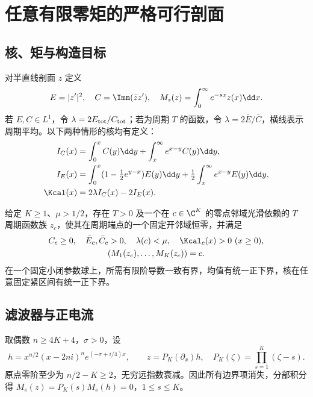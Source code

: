\section{任意有限零矩的严格可行剖面}\label{sec:profile}
\subsection{核、矩与构造目标}
对半直线剖面 $z$ 定义
\begin{equation}\label{eq:profile-densities}
E=|z'|^2,\quad C=\Imn(\bar z z'),\quad
M_s(z)=\int_0^\infty e^{-sx}z(x)\dd x.
\end{equation}
若 $E,C\in L^1$，令 $\lambda=2E_{\rm tot}/C_{\rm tot}$；若为周期 $T$ 的函数，令 $\lambda=2\bar E/\bar C$，横线表示周期平均。以下两种情形的核均有定义：
\begin{align}
I_C(x)&=\int_0^xC(y)\dd y+\int_x^\infty e^{x-y}C(y)\dd y,\label{eq:IC}\\
I_E(x)&=\int_0^x(1-\tfrac12e^{y-x})E(y)\dd y
+\tfrac12\int_x^\infty e^{x-y}E(y)\dd y,\label{eq:IE}\\
\Kcal(x)&=2\lambda I_C(x)-2I_E(x).\label{eq:K}
\end{align}

\begin{proposition}[固定有限阶的可行剖面族]\label{prop:profile}
给定 $K\ge1$、$\mu>1/2$，存在 $T>0$ 及一个在 $c\in\C^K$ 的零点邻域光滑依赖的 $T$ 周期函数族 $z_c$，使其在周期端点的一个固定开邻域恒零，并满足
\begin{gather}
C_c\ge0,\quad \bar E_c,\bar C_c>0,\quad
\lambda(c)<\mu,\quad \Kcal_c(x)>0\ (x\ge0),\label{eq:profile-target}\\
(M_1(z_c),\ldots,M_K(z_c))=c.\label{eq:moment-coordinates}
\end{gather}
在一个固定小闭参数球上，所需有限阶导数一致有界，均值有统一正下界，核在任意固定紧区间有统一正下界。
\end{proposition}

\subsection{滤波器与正电流}
取偶数 $n\ge4K+4$，$\sigma>0$，设
\begin{equation}\label{eq:seed}
h=x^{n/2}(x-2ni)^n e^{(-\sigma+i/4)x},\qquad
z=P_K(\partial_x)h,\quad P_K(\zeta)=\prod_{s=1}^K(\zeta-s).
\end{equation}
原点零阶至少为 $n/2-K\ge2$，无穷远指数衰减。因此所有边界项消失，分部积分得 $M_s(z)=P_K(s)M_s(h)=0$，$1\le s\le K$。

